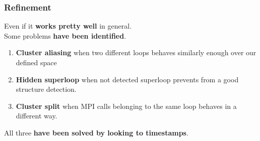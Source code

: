 \documentclass{beamer}
\begin{document}
\begin{frame}
\titlepage
\end{frame}



\appendix

\begin{frame}
\frametitle{Refinement}
Even if it \textbf{works pretty well} in general. \\
Some problems \textbf{have been identified}.
\begin{enumerate}
	\item \textbf{Cluster aliasing} when two different loops behaves similarly enough over our defined space
	\item \textbf{Hidden superloop} when not detected superloop prevents from a good structure detection.
	\item \textbf{Cluster split} when MPI calls belonging to the same loop behaves in a different way.
\end{enumerate}
All three \textbf{have been solved by looking to timestamps}.

\end{frame}
\end{document}
